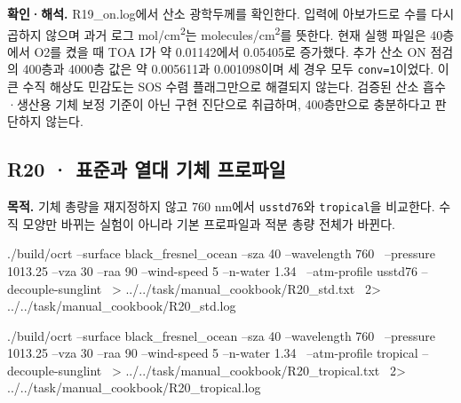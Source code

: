 \textbf{확인·해석. }R19\_on.log에서 산소 광학두께를 확인한다. 입력에 아보가드로 수를 다시 곱하지 않으며 과거 로그 mol/cm\textsuperscript{2}는 molecules/cm\textsuperscript{2}를 뜻한다. 현재 실행 파일은 40층에서 O2를 켰을 때 TOA I가 약 0.01142에서 0.05405로 증가했다. 추가 산소 ON 점검의 400층과 4000층 값은 약 0.005611과 0.001098이며 세 경우 모두 \texttt{conv=\allowbreak{}1}이었다. 이 큰 수직 해상도 민감도는 SOS 수렴 플래그만으로 해결되지 않는다. 검증된 산소 흡수·생산용 기체 보정 기준이 아닌 구현 진단으로 취급하며, 400층만으로 충분하다고 판단하지 않는다.


\subsection{R20 · 표준과 열대 기체 프로파일}
\label{sec:auto:09_cookbook:4.5}

\label{recipe:R20}

\textbf{목적. }기체 총량을 재지정하지 않고 760 nm에서 \texttt{usstd76}와 \texttt{tropical}을 비교한다. 수직 모양만 바뀌는 실험이 아니라 기본 프로파일과 적분 총량 전체가 바뀐다.

\noindent\begin{minipage}{\linewidth}
\begin{ManualCode}

./build/ocrt --surface black_fresnel_ocean --sza 40 --wavelength 760 \
  --pressure 1013.25 --vza 30 --raa 90 --wind-speed 5 --n-water 1.34 \
  --atm-profile usstd76 --decouple-sunglint \
  > ../../task/manual_cookbook/R20_std.txt \
  2> ../../task/manual_cookbook/R20_std.log

\end{ManualCode}
\end{minipage}\par

\noindent\begin{minipage}{\linewidth}
\begin{ManualCode}

./build/ocrt --surface black_fresnel_ocean --sza 40 --wavelength 760 \
  --pressure 1013.25 --vza 30 --raa 90 --wind-speed 5 --n-water 1.34 \
  --atm-profile tropical --decouple-sunglint \
  > ../../task/manual_cookbook/R20_tropical.txt \
  2> ../../task/manual_cookbook/R20_tropical.log

\end{ManualCode}
\end{minipage}\par

